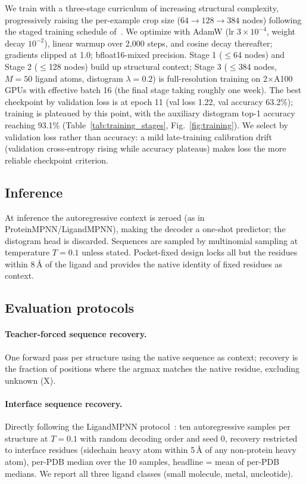 \documentclass[11pt,letterpaper]{article}
\begin{document}
We train with a three-stage curriculum of increasing structural complexity, progressively raising
the per-example crop size ($64\to128\to384$ nodes) following the staged training schedule
of~\citet{ouyangzhang2025pairmixer}. We optimize with AdamW
\citep{loshchilov2019adamw} (lr $3{\times}10^{-4}$, weight decay $10^{-2}$), linear warmup over
2{,}000 steps, and cosine decay thereafter; gradients clipped at 1.0; bfloat16-mixed precision.
Stage 1 ($\leq$64 nodes) and Stage 2 ($\leq$128 nodes) build up structural context; Stage 3
($\leq$384 nodes, $M{=}50$ ligand atoms, distogram $\lambda{=}0.2$) is full-resolution training on
2$\times$A100 GPUs with effective batch 16 (the final stage taking roughly one week). The best
checkpoint by validation loss is at epoch
11 (val loss 1.22, val accuracy 63.2\%); training is plateaued by this
point, with the auxiliary distogram top-1 accuracy reaching 93.1\%
(Table~\ref{tab:training_stages}, Fig.~\ref{fig:training}). We select by validation loss rather than
accuracy: a mild late-training calibration drift (validation cross-entropy rising while accuracy
plateaus) makes loss the more reliable checkpoint criterion.

\subsection{Inference}
\label{sec:inference}

At inference the autoregressive context is zeroed (as in ProteinMPNN/LigandMPNN), making the decoder
a one-shot predictor; the distogram head is discarded. Sequences are sampled by multinomial sampling
at temperature $T{=}0.1$ unless stated. Pocket-fixed design locks all but the residues within
8\,{\AA} of the ligand and provides the native identity of fixed residues as context.

\subsection{Evaluation protocols}
\label{sec:eval}

\paragraph{Teacher-forced sequence recovery.}
One forward pass per structure using the native sequence as context; recovery is the fraction of
positions where the argmax matches the native residue, excluding unknown (X).

\paragraph{Interface sequence recovery.}
Directly following the LigandMPNN protocol~\citep{dauparas2025ligandmpnn}: ten autoregressive samples per
structure at $T{=}0.1$ with random decoding order and seed 0, recovery restricted to interface
residues (sidechain heavy atom within 5\,{\AA} of any non-protein heavy atom), per-PDB median over
the 10 samples, headline = mean of per-PDB medians. We report all three ligand classes
(small molecule, metal, nucleotide).
\end{document}
